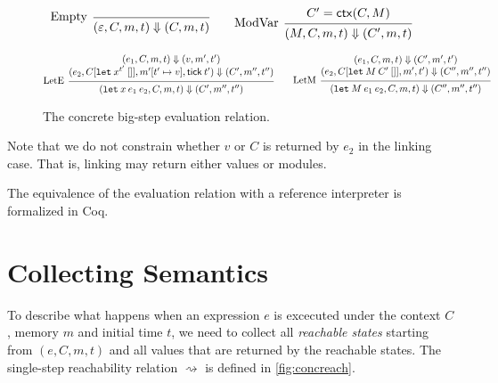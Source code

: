 \documentclass[acmsmall,screen,review]{acmart}
\theoremstyle{definition}
\newcommand*{\mem}{m}
\newcommand*{\tick}{\mathsf{tick}}
\newcommand*{\modctx}{\mathsf{ctx}}
\begin{document}
\begin{figure}[htb]
  \[
    \begin{prooftree}
      \infer[left label=Empty]0{
      (\varepsilon, C, \mem, t)
      \Downarrow
      (C, \mem, t)
      }
    \end{prooftree}\qquad
    \begin{prooftree}
      \hypo{C'=\modctx(C,M)}
      \infer[left label=ModVar]1{
      (M, C, \mem, t)
      \Downarrow
      (C', \mem, t)
      }
    \end{prooftree}
  \]

  \[
    \begin{prooftree}
      \hypo{
        \begin{matrix}
          (e_{1}, C, \mem, t)
          \Downarrow
          (v, \mem', t') \\
          (e_{2}, C[\mathtt{let}\:x^{t'}\:[]], \mem'[t'\mapsto v], \tick\:t')
          \Downarrow
          (C', \mem'', t'')
        \end{matrix}
      }
      \infer[left label=LetE]1{
      (\mathtt{let}\:x\:e_1\:e_2, C, \mem, t)
      \Downarrow
      (C', \mem'', t'')
      }
    \end{prooftree}\qquad
    \begin{prooftree}
      \hypo{
        \begin{matrix}
          (e_{1}, C, \mem, t)
          \Downarrow
          (C', \mem', t') \\
          (e_{2}, C[\mathtt{let}\:M\:C'\:[]], \mem', t')
          \Downarrow
          (C'', \mem'', t'')
        \end{matrix}
      }
      \infer[left label=LetM]1{
      (\mathtt{let}\:M\:e_{1}\:e_{2}, C, \mem, t)
      \Downarrow
      (C'', \mem'', t'')
      }
    \end{prooftree}
  \]
  \caption{The concrete big-step evaluation relation.}
  \label{fig:conceval}
\end{figure}
Note that we do not constrain whether $v$ or $C$ is returned by $e_{2}$ in the linking case.
That is, linking may return either values or modules.

The equivalence of the evaluation relation with a reference interpreter is formalized in Coq.

\section{Collecting Semantics}

To describe what happens when an expression $e$ is excecuted under the context $C$, memory $\mem$ and initial time $t$, we need to collect all \emph{reachable states} starting from $(e,C,\mem,t)$ and all values that are returned by the reachable states.
The single-step reachability relation $\rightsquigarrow$ is defined in \ref{fig:concreach}.
\end{document}
